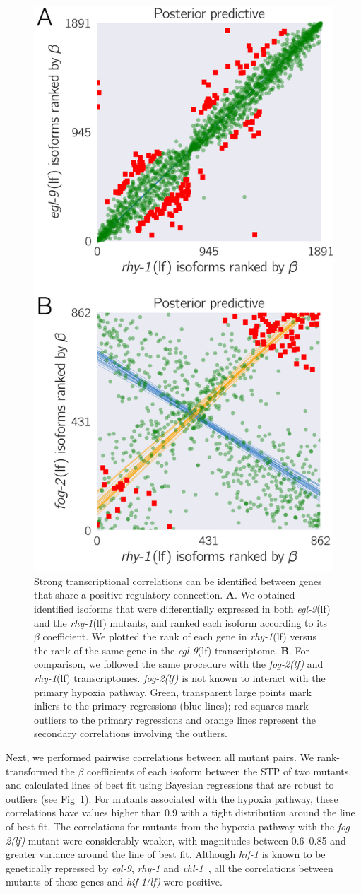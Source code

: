 \documentclass[9pt,twocolumn,twoside,lineno]{pnas-new}
\newcommand{\gene}[1]{\mbox{\emph{#1}}}
\newcommand{\fog}{\gene{fog-2(lf)}}
\newcommand{\egl}{\gene{egl-9}(lf)}
\newcommand{\rhy}{\gene{rhy-1}(lf)}
\newcommand{\hif}{\gene{hif-1(lf)}}
\begin{document}
\begin{figure}[tbhp]
  \centering
  \includegraphics[width=.4\textwidth]{../figs/positive_and_control.pdf}
  \caption{
    Strong transcriptional correlations can be identified between genes that
    share a positive regulatory connection.
    \textbf{A}. We obtained identified
    isoforms that were differentially expressed in both \egl{} and the \rhy{}
    mutants, and ranked each isoform according to its $\beta$ coefficient. We
    plotted the rank of each gene in \rhy{} versus the rank of the same gene in
    the \egl{} transcriptome.
    \textbf{B}. For comparison, we followed the same
    procedure with the \fog{} and \rhy{} transcriptomes. \fog{} is not known to
    interact with the primary hypoxia pathway.
    Green, transparent large points
    mark inliers to the primary regressions (blue lines); red squares mark
    outliers to the primary regressions and orange lines represent the secondary
    correlations involving the outliers.
  }
\label{fig:genetic_interactions}
\end{figure}

Next, we performed pairwise correlations between all mutant pairs. We
rank-transformed the $\beta$ coefficients of each isoform between the STP of two
mutants, and calculated lines of best fit using Bayesian regressions that are
robust to outliers (see Fig~\ref{fig:genetic_interactions}). For mutants
associated with the hypoxia pathway, these correlations have values higher than
0.9 with a tight distribution around the line of best fit. The correlations for
mutants from the hypoxia pathway with the \fog{} mutant were considerably
weaker, with magnitudes between 0.6--0.85 and greater variance around the line
of best fit. Although \gene{hif-1} is known to be genetically repressed by
\gene{egl-9}, \gene{rhy-1} and \gene{vhl-1}~\cite{Epstein2001,Shen2006}, all the
correlations between mutants of these genes and \hif{} were positive.
\end{document}
